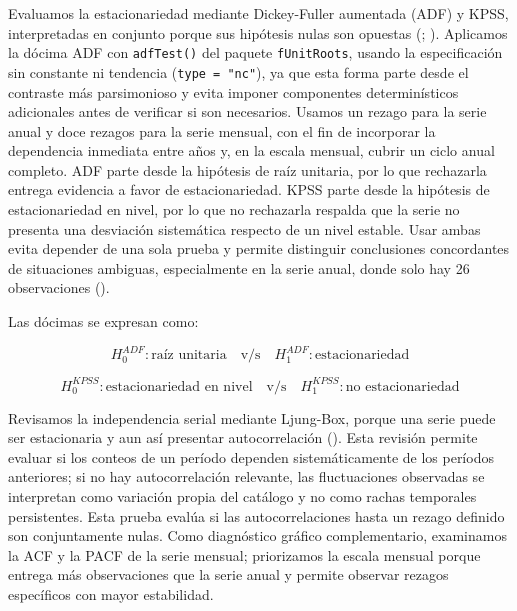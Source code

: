 \documentclass[
  spanish,
  letterpaper,
  DIV=11,
  numbers=noendperiod]{scrartcl}
\begin{document}
Evaluamos la estacionariedad mediante Dickey-Fuller aumentada (ADF) y
KPSS, interpretadas en conjunto porque sus hipótesis nulas son opuestas
(;
).
Aplicamos la dócima ADF con \texttt{adfTest()} del paquete
\texttt{fUnitRoots}, usando la especificación sin constante ni tendencia
(\texttt{type\ =\ "nc"}), ya que esta forma parte desde el contraste más
parsimonioso y evita imponer componentes determinísticos adicionales
antes de verificar si son necesarios. Usamos un rezago para la serie
anual y doce rezagos para la serie mensual, con el fin de incorporar la
dependencia inmediata entre años y, en la escala mensual, cubrir un
ciclo anual completo. ADF parte desde la hipótesis de raíz unitaria, por
lo que rechazarla entrega evidencia a favor de estacionariedad. KPSS
parte desde la hipótesis de estacionariedad en nivel, por lo que no
rechazarla respalda que la serie no presenta una desviación sistemática
respecto de un nivel estable. Usar ambas evita depender de una sola
prueba y permite distinguir conclusiones concordantes de situaciones
ambiguas, especialmente en la serie anual, donde solo hay 26
observaciones ().

Las dócimas se expresan como:

\begingroup
\setlength{\abovedisplayskip}{0pt}
\setlength{\belowdisplayskip}{0pt}
\setlength{\abovedisplayshortskip}{0pt}
\setlength{\belowdisplayshortskip}{0pt}
\vspace{-1.10em}
\[
H_0^{ADF}: \text{raíz unitaria}
\quad \text{v/s} \quad
H_1^{ADF}: \text{estacionariedad}
\]
\vspace{-1.15em}
\endgroup

\begingroup
\setlength{\abovedisplayskip}{0pt}
\setlength{\belowdisplayskip}{0pt}
\setlength{\abovedisplayshortskip}{0pt}
\setlength{\belowdisplayshortskip}{0pt}
\vspace{-1.10em}
\[
H_0^{KPSS}: \text{estacionariedad en nivel}
\quad \text{v/s} \quad
H_1^{KPSS}: \text{no estacionariedad}
\]
\vspace{-1.15em}
\endgroup

Revisamos la independencia serial mediante Ljung-Box, porque una serie
puede ser estacionaria y aun así presentar autocorrelación
(). Esta revisión permite
evaluar si los conteos de un período dependen sistemáticamente de los
períodos anteriores; si no hay autocorrelación relevante, las
fluctuaciones observadas se interpretan como variación propia del
catálogo y no como rachas temporales persistentes. Esta prueba evalúa si
las autocorrelaciones hasta un rezago definido son conjuntamente nulas.
Como diagnóstico gráfico complementario, examinamos la ACF y la PACF de
la serie mensual; priorizamos la escala mensual porque entrega más
observaciones que la serie anual y permite observar rezagos específicos
con mayor estabilidad.
\end{document}
